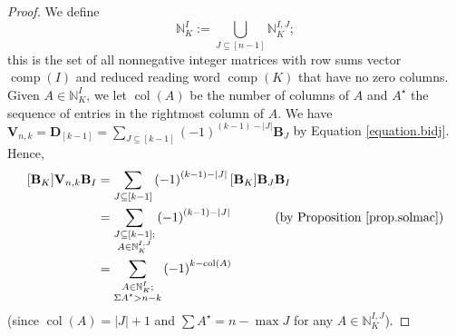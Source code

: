 \documentclass[revision]{FPSAC2025}
\newcommand{\NN}{\mathbb{N}} %
\newcommand{\comp}{\operatorname{comp}}
\newcommand{\col}{\operatorname{col}}
\begin{document}
\begin{proof}
We define
\[
\mathbb{N}^{I}_K := \bigcup_{J \subseteq [n-1]}\mathbb{N}^{I, J}_K;
\]
this is the set of all nonnegative integer matrices with row sums vector $\comp(I)$ and reduced reading word $\comp(K)$ that have no zero columns. Given $A \in \mathbb{N}^{I}_K$, we let $\col(A)$ be the number of columns of $A$ and $A^\star$ the sequence of entries in the rightmost column of $A$. We have
$
\mathbf{V}_{n,k} = \mathbf{D}_{\left[  k-1\right]  }
= \sum\limits_{J\subseteq\left[
k-1\right]  }\left(  -1\right)  ^{\left(  k-1\right)  -\left\vert J\right\vert}\mathbf{B}_{J}
$
by Equation \eqref{equation.bidj}.
Hence,
\begin{align}
\nonumber [\mathbf{B}_K]\mathbf{V}_{n,k}\mathbf{B}_{I}  & =\sum_{J\subseteq\left[  k-1\right]
}\left(  -1\right)  ^{\left(  k-1\right)  -\left\vert J\right\vert }%
[\mathbf{B}_K]\mathbf{B}_{J}\mathbf{B}_{I}\\
\nonumber & = \sum_{\substack{J\subseteq\left[  k-1\right]; \\ A\in
\mathbb{N}^{I, J}_K }}\left(
-1\right)  ^{  \left(  k-1\right)  -\left\vert J\right\vert}\ \ \ \ \ \ \ \ \ \ \left(
\text{by Proposition \ref{prop.solmac}}\right)  \\
\label{equation.sum_A}
& = \sum_{\substack{A\in \mathbb{N}^{I}_K; \\ \Sigma A^\star >n-k}}
\left(  -1\right)  ^{ k  - \col(A)}
\end{align}
(since $\col(A) = |J| + 1$ and $\sum A^\star = n - \max J$ for any $A \in \NN^{I,J}_K$).


\end{proof}
\end{document}
